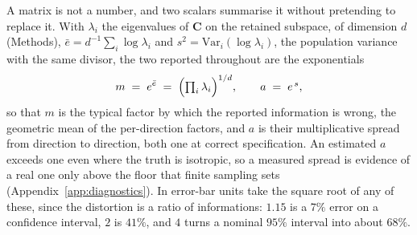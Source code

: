 A matrix is not a number, and two scalars summarise it without pretending to replace it. With
$\lambda_i$ the eigenvalues of $\mathbf{C}$ on the retained subspace, of dimension $d$ (Methods),
$\bar e = d^{-1}\sum_i \log\lambda_i$ and $s^2 = \mathrm{Var}_i(\log\lambda_i)$, the population
variance with the same divisor, the two reported
throughout are the exponentials
\begin{equation}
  m \;=\; e^{\bar e} \;=\; \Bigl(\textstyle\prod_i \lambda_i\Bigr)^{1/d},
  \qquad
  a \;=\; e^{\,s},
  \label{eq:magnitude-anisotropy}
\end{equation}
so that $m$ is the typical factor by which the reported information is wrong, the geometric mean of
the per-direction factors, and $a$ is their multiplicative spread from direction to direction, both
one at correct specification.
An estimated $a$ exceeds one even where the truth is isotropic,
so a measured spread is evidence of a real one only above the floor that finite sampling sets
(Appendix~\ref{app:diagnostics}). In error-bar units take the square root of any of these, since the
distortion is a ratio of informations: $1.15$ is a $7\%$ error on a confidence interval, $2$ is
$41\%$, and $4$ turns a nominal $95\%$ interval into about $68\%$.
